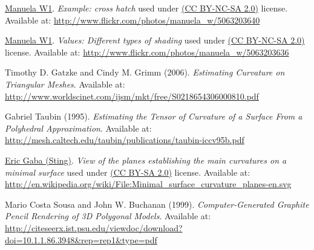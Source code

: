 \begin{thebibliography}{9}

  \href{http://www.flickr.com/photos/manuela_w/}{Manuela W1}.  \emph{Example:
  cross hatch} used under
  \href{http://creativecommons.org/licenses/by-nc-sa/2.0/}{(CC BY-NC-SA 2.0)}
  license.  Available at:
  \url{http://www.flickr.com/photos/manuela_w/5063203640}

  \href{http://www.flickr.com/photos/manuela_w/}{Manuela W1}.  \emph{Values:
  Different types of shading} used under
  \href{http://creativecommons.org/licenses/by-nc-sa/2.0/}{(CC BY-NC-SA 2.0)}
  license.  Available at:
  \url{http://www.flickr.com/photos/manuela_w/5063203636}

  Timothy D. Gatzke and Cindy M. Grimm (2006). \emph{Estimating Curvature on
  Triangular Meshes}.  Available at:
  \url{http://www.worldscinet.com/ijsm/mkt/free/S0218654306000810.pdf}

  Gabriel Taubin (1995). \emph{Estimating the Tensor of Curvature of a Surface
  From a Polyhedral Approximation}.  Available at:
  \url{http://mesh.caltech.edu/taubin/publications/taubin-iccv95b.pdf}

  \href{http://commons.wikimedia.org/wiki/User:Sting}{Eric Gaba (Sting)}.
  \emph{View of the planes establishing the main curvatures on a minimal
  surface} used under \href{http://creativecommons.org/licenses/by-sa/2.0/}{(CC
  BY-SA 2.0)} license.  Available at:
  \url{http://en.wikipedia.org/wiki/File:Minimal_surface_curvature_planes-en.svg}

  Mario Costa Sousa and John W. Buchanan (1999). \emph{Computer-Generated
  Graphite Pencil Rendering of 3D Polygonal Models}. Available at:
  \url{http://citeseerx.ist.psu.edu/viewdoc/download?doi=10.1.1.86.3948&rep=rep1&type=pdf}
\end{thebibliography}
